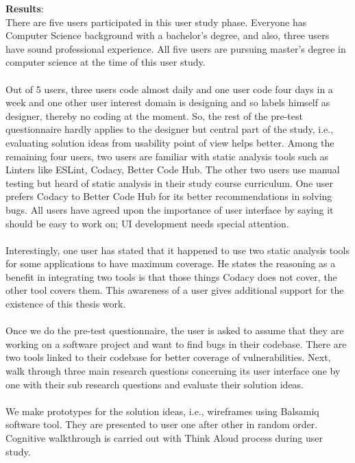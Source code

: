 \textbf{Results}: \\

There are five users participated in this user study phase. Everyone has Computer Science background with a bachelor’s degree, and also, three users have sound professional experience. All five users are pursuing master’s degree in computer science at the time of this user study. \\ \\

Out of 5 users, three users code almost daily and one user code four days in a week and one other user interest domain is designing and so labels himself as designer, thereby no coding at the moment. So, the rest of the pre-test questionnaire hardly applies to the designer but central part of the study, i.e., evaluating solution ideas from usability point of view helps better. Among the remaining four users, two users are familiar with static analysis tools such as Linters like ESLint, Codacy, Better Code Hub. The other two users use manual testing but heard of static analysis in their study course curriculum. One user prefers Codacy to Better Code Hub for its better recommendations in solving bugs. All users have agreed upon the importance of user interface by saying it should be easy to work on;  UI development needs special attention.\\ \\

Interestingly, one user has stated that it happened to use two static analysis tools for some applications to have maximum coverage. He states the reasoning as a benefit in integrating two tools is that those things Codacy does not cover, the other tool covers them. This awareness of a user gives additional support for the existence of this thesis work.
\\ \\

Once we do the pre-test questionnaire, the user is asked to assume that they are working on a software project and want to find bugs in their codebase. There are two tools linked to their codebase for better coverage of vulnerabilities. Next, walk through three main research questions concerning its user interface one by one with their sub research questions and evaluate their solution ideas. \\ \\

We make prototypes for the solution ideas, i.e., wireframes using Balsamiq software tool. They are presented to user one after other in random order. Cognitive walkthrough is carried out with Think Aloud process during user study. \\ \\

